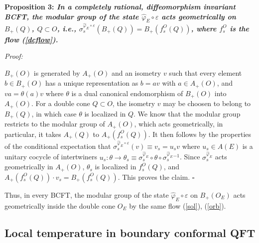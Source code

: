 \documentclass[12pt]{article}
\def\eps{\varepsilon}
\def\inv{^{-1}}
\def \QED {\hspace*{\fill}$\square$\medskip}
\begin{document}
\medskip

{\bf Proposition 3: \sl In a completely rational, diffeomorphism
  invariant BCFT, the modular group of the state
  $\widehat\varphi_E\circ\eps$ acts geometrically on $B_+(Q)$,
  $Q\subset O$, i.e., $\sigma^{\widehat\varphi_E\circ\eps}_s(B_+(Q)) =
  B_+(f^O_s(Q))$, where $f^O_s$ is the flow (\ref{dcflow}). 

\medskip 

\it Proof:} $B_+(O)$ is generated by $A_+(O)$ and an isometry $v$
\cite{LR04} such that every element $b\in B_+(O)$ has a unique
representation as $b=av$ with $a\in A_+(O)$, and $va=\theta(a)v$ where
$\theta$ is a dual canonical endomorphism of $B_+(O)$ into $A_+(O)$. 
For a double cone $Q\subset O$, the isometry $v$ may be choosen to
belong to $B_+(Q)$, in which case $\theta$ is localized in $Q$. We
know that the modular group restricts to the modular group of
$A_+(O)$, which acts geometrically, in particular, it takes $A_+(Q)$
to $A_+(f^O_s(Q))$. It then follows by the properties of the
conditional expectation that $\sigma^{\widehat\varphi_E\circ\eps}_s(v)
\equiv v_s = u_sv$ where $u_s\in A(E)$ is a unitary cocycle of
intertwiners $u_s:\theta\to\theta_s\equiv \sigma^{\widehat\varphi_E}_s
\circ\theta\circ\sigma^{\widehat\varphi_E}_s{}\inv$. Since  
$\sigma^{\widehat\varphi_E}_s$ acts geometrically in $A_+(O)$,
$\theta_s$ is localized in $f^O_s(Q)$, and $A_+(f^O_s(Q))\cdot v_s =
B_+(f^O_s(Q))$. This proves the claim. 
\QED

Thus, in every BCFT, the modular group of the state
$\widehat\varphi_E\circ\eps$ on $B_+(O_E)$ acts geometrically inside
the double cone $O_E$ by the same flow (\ref{sol}), (\ref{orb}).


\subsection{Local temperature in boundary conformal QFT} 
\label{sec:localtemp}
\end{document}
